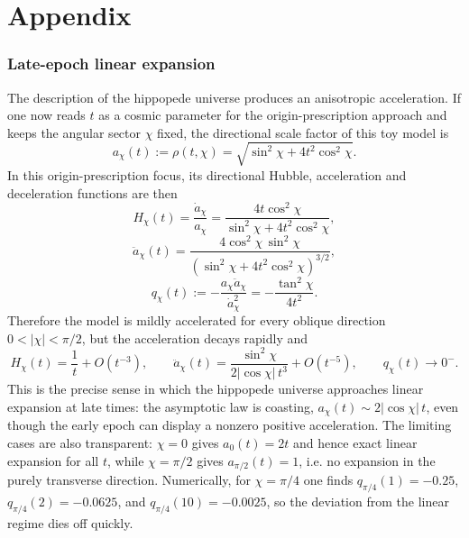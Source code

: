 \documentclass[preprint,12pt]{elsarticle}
\begin{document}




\section*{Appendix}

\subsubsection*{Late-epoch linear expansion}

The description of the hippopede universe produces an anisotropic acceleration. If one now reads $t$ as a cosmic parameter for the origin-prescription approach and keeps the angular sector $\chi$ fixed, the directional scale factor of this toy model is
\begin{equation}
a_\chi(t):=\rho(t,\chi)=\sqrt{\sin^2\chi+4t^2\cos^2\chi}.
\end{equation}
In this origin-prescription focus, its directional Hubble, acceleration and deceleration functions are then
\begin{equation}
H_\chi(t)=\frac{\dot a_\chi}{a_\chi}=\frac{4t\cos^2\chi}{\sin^2\chi+4t^2\cos^2\chi},
\end{equation}
\begin{equation}
\ddot a_\chi(t)=\frac{4\cos^2\chi\,\sin^2\chi}{\left(\sin^2\chi+4t^2\cos^2\chi\right)^{3/2}},
\end{equation}
\begin{equation}
q_\chi(t):=-\frac{a_\chi\ddot a_\chi}{\dot a_\chi^2}=-\frac{\tan^2\chi}{4t^2}.
\end{equation}
Therefore the model is mildly accelerated for every oblique direction $0<|\chi|<\pi/2$, but the acceleration decays rapidly and
\begin{equation}
H_\chi(t)=\frac{1}{t}+O(t^{-3}),\qquad \ddot a_\chi(t)=\frac{\sin^2\chi}{2|{\cos\chi}|\,t^3}+O(t^{-5}),\qquad q_\chi(t)\to0^-.
\end{equation}
This is the precise sense in which the hippopede universe approaches linear expansion at late times: the asymptotic law is coasting, $a_\chi(t)\sim 2|{\cos\chi}|\,t$, even though the early epoch can display a nonzero positive acceleration. The limiting cases are also transparent: $\chi=0$ gives $a_0(t)=2t$ and hence exact linear expansion for all $t$, while $\chi=\pi/2$ gives $a_{\pi/2}(t)=1$, i.e. no expansion in the purely transverse direction. Numerically, for $\chi=\pi/4$ one finds $q_{\pi/4}(1)=-0.25$, $q_{\pi/4}(2)=-0.0625$, and $q_{\pi/4}(10)=-0.0025$, so the deviation from the linear regime dies off quickly.
\end{document}
